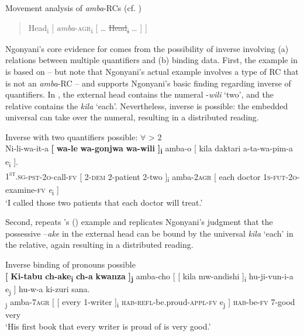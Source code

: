 \documentclass[output=paper
,newtxmath
,modfonts
,nonflat]{langsci/langscibook}
\begin{document}
\ea\label{ex:gould:5}Movement analysis of \textit{amba}{}-RCs (cf. \citealt{Ngonyani2006})\\
\begin{quote}
Head\textsubscript{i} [ \textit{amba}{}-\textsc{agr}\textsubscript{i} [ … \sout{Head\textsubscript{i}} … ] ]
\end{quote}
\z

Ngonyani’s core evidence for  comes from the possibility of inverse  involving (a)  relations between multiple quantifiers and (b) binding data. First, the example in  is based on \citet[66]{Ngonyani2001} – but note that Ngonyani’s actual example involves a type of RC that is not an \textit{amba}{}-RC – and supports Ngonyani’s basic finding regarding inverse  of quantifiers. In , the external head contains the numeral -\textit{wili} ‘two’, and the relative contains the  \textit{kila} ‘each’. Nevertheless, inverse  is possible: the embedded universal can take  over the numeral, resulting in a distributed reading.

\ea\label{ex:gould:6}Inverse  with two quantifiers possible:  $\forall$ > 2\\
\gll Ni-li-wa-it-a \textbf{[} \textbf{wa-le} \textbf{wa-gonjwa} \textbf{wa-wili} \textbf{]\textsubscript{i}} amba-o [ kila daktari a-ta-wa-pim-a e\textsubscript{i} ].\\
\textsc{1\textsuperscript{st}.sg}\textsc{{}-pst-2o}{}-call-\textsc{fv} [ \textsc{2-dem} 2-patient 2-two ]\textsubscript{i} amba{}-2\textsc{agr} [ each doctor \textsc{1s-fut-2o}{}-examine-\textsc{fv} \textit{e}\textsubscript{i} ]\\
\glt ‘I called those two patients that each doctor will treat.’
\z

Second,  repeats \citeauthor{Ngonyani2001}'s ({\citeyear[65]{Ngonyani2001}}) example and replicates Ngonyani’s judgment that the possessive  –\textit{ake} in the external head can be bound by the universal \textit{kila} ‘each’ in the relative, again resulting in a distributed reading. 

\ea\label{ex:gould:7}Inverse binding of pronouns possible\\
\gll \textbf{[} \textbf{Ki-tabu} \textbf{ch-ake\textsubscript{i}} \textbf{ch-a} \textbf{kwanza} \textbf{]\textsubscript{j}} amba-cho [ [ kila mw-andishi ]\textsubscript{i} hu-ji-vun-i-a e\textsubscript{j} ] hu-w-a ki-zuri sana.\\
[ 7-book 7-\textsc{3\textsuperscript{rd}.sg.poss}\textsubscript{i} 7-of first ]\textsubscript{j} amba-\textsc{7agr} [ [ every 1-writer ]\textsubscript{i} \textsc{hab}{}-\textsc{refl}{}-be.proud-\textsc{appl}{}-\textsc{fv} e\textsubscript{j} ] \textsc{hab}{}-be-\textsc{fv} 7-good very\\
\glt ‘His first book that every writer is proud of is very good.’
\z
\end{document}
